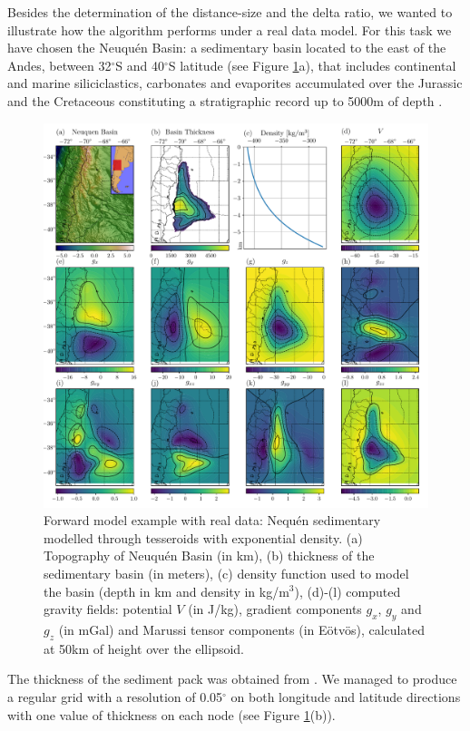 \documentclass[extra]{gji}
\begin{document}
Besides the determination of the distance-size and the delta ratio, we 
wanted to illustrate how the algorithm performs under a real data model.
For this task we have chosen the Neuqu\'en Basin: a sedimentary basin 
located to the east of the Andes, between 32$^\circ$S and 40$^\circ$S latitude 
(see Figure \ref{fig:neuquen-basin}a), that includes continental and marine 
siliciclastics, carbonates and evaporites accumulated over the Jurassic and 
the Cretaceous constituting a stratigraphic record up to 5000m of depth 
\citep{Howell2005}.

\begin{figure}
\centering
\includegraphics[width=\linewidth]{figures/neuquen-basin.pdf}
\caption{
    Forward model example with real data: Nequ\'en sedimentary modelled 
    through tesseroids with exponential density.
    (a) Topography of Neuqu\'en Basin (in km),
    (b) thickness of the sedimentary basin (in meters),
    (c) density function used to model the basin (depth in km and density in 
    kg/m$^3$),
    (d)-(l) computed gravity fields: potential $V$ (in J/kg), gradient 
    components $g_x$, $g_y$ and $g_z$ (in mGal) and Marussi tensor components 
    (in Eötvös), calculated at 50km of height over the ellipsoid.}
\label{fig:neuquen-basin}
\end{figure}

The thickness of the sediment pack was obtained from \citet{Heine2007}.
We managed to produce a regular grid with a resolution of 0.05$^\circ$ on both 
longitude and latitude directions with one value of thickness on each node 
(see Figure \ref{fig:neuquen-basin}(b)).
\end{document}
